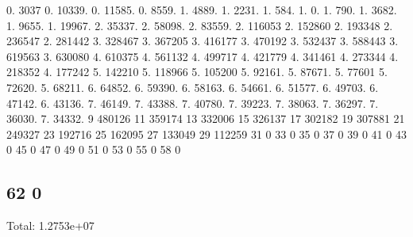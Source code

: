 0. 3037 0. 10339. 0. 11585. 0. 8559. 1. 4889. 1. 2231. 1. 584. 1. 0. 1. 790. 1. 3682. 1. 9655. 1. 19967. 2. 35337. 2. 58098. 2. 83559. 2. 116053 2. 152860 2. 193348 2. 236547 2. 281442 3. 328467 3. 367205 3. 416177 3. 470192 3. 532437 3. 588443 3. 619563 3. 630080 4. 610375 4. 561132 4. 499717 4. 421779 4. 341461 4. 273344 4. 218352 4. 177242 5. 142210 5. 118966 5. 105200 5. 92161. 5. 87671. 5. 77601 5. 72620. 5. 68211. 6. 64852. 6. 59390. 6. 58163. 6. 54661. 6. 51577. 6. 49703. 6. 47142. 6. 43136. 7. 46149. 7. 43388. 7. 40780. 7. 39223. 7. 38063. 7. 36297. 7. 36030. 7. 34332. 9 480126 11 359174 13 332006 15 326137 17 302182 19 307881 21 249327 23 192716 25 162095 27 133049 29 112259 31 0 33 0 35 0 37 0 39 0 41 0 43 0 45 0 47 0 49 0 51 0 53 0 55 0 58 0 \subsection*{62 0 }

Total\+: 1.\+2753e+07 